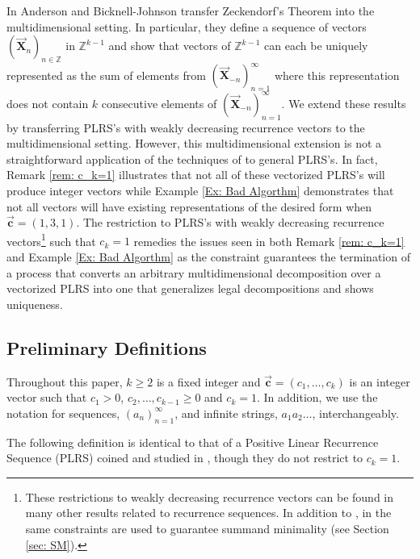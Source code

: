 \documentclass[]{interact}
\newcommand{\Z}{{\mathbb Z}}  %
\newcommand{\vtr}[1]{\vec{\mathbf{#1}}}
\theoremstyle{plain}
\numberwithin{equation}{section} %
\numberwithin{table}{section} %
\numberwithin{figure}{section}
\begin{document}
In \textcolor{blue}{\cite{ABJ11}} Anderson and Bicknell-Johnson transfer Zeckendorf's Theorem into the multidimensional setting. In particular, they define a sequence of vectors $(\vtr{X}_n)_{n\in \Z}$ in $\Z^{k-1}$ and show that vectors of $\Z^{k-1}$ can each be uniquely represented as the sum of elements from $(\vtr{X}_{-n})_{n=1}^\infty$ where this representation does not contain $k$ consecutive elements of $(\vtr{X}_{-n})_{n=1}^\infty$. We extend these results by transferring PLRS's with weakly decreasing recurrence vectors to the multidimensional setting. However, this multidimensional extension is not a straightforward application of the techniques of \textcolor{blue}{\cite{ABJ11}} to general PLRS's. In fact, Remark \textcolor{blue}{\ref{rem: c_k=1}} illustrates that not all of these vectorized PLRS's will produce integer vectors while Example \textcolor{blue}{\ref{Ex: Bad Algorthm}} demonstrates  that not all vectors will have existing representations of the desired form when $\vtr{c}=(1,3,1)$. The restriction to PLRS's with weakly decreasing recurrence vectors\footnote{These restrictions to weakly decreasing recurrence vectors can be found in many other results related to recurrence sequences. In addition to \textcolor{blue}{\cite{Fr}}, in \textcolor{blue}{\cite{CHHMPV18b, CHHMPV18b}} the same constraints are used to guarantee summand minimality (see Section \textcolor{blue}{\ref{sec: SM}}).} such that $c_k=1$ remedies the issues seen in both Remark \textcolor{blue}{\ref{rem: c_k=1}} and Example \textcolor{blue}{\ref{Ex: Bad Algorthm}} as the constraint guarantees the termination of a process that converts an arbitrary multidimensional decomposition over a vectorized PLRS into one that generalizes legal decompositions and shows uniqueness.
 
\subsection{Preliminary Definitions}

Throughout this paper, $k \geq 2$ is a fixed integer and $\vtr{c} = (c_1,\ldots, c_k)$ is an integer vector such that $c_1>0$, $c_2,\ldots, c_{k-1} \geq 0$ and $c_k=1$. In addition, we use the notation for sequences, $(a_n)_{n=1}^\infty$, and infinite strings, $a_1a_2\ldots$, interchangeably.

The following definition is identical to that of a Positive Linear Recurrence Sequence (PLRS) coined and studied in \textcolor{blue}{\cite{KKMW11}}, though they do not restrict to $c_k=1$.
\end{document}
